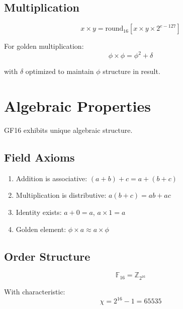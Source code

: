 \subsection{Multiplication}

\begin{definition}[GF16 Multiplication]
\label{def:gf16-mul}
\begin{equation}
x \times y = \text{round}_{16}\left[x \times y \times 2^{e-127}\right]
\end{equation}
\end{definition}

\begin{proposition}
\label{prop:mul-golden}
For golden multiplication:
\begin{equation}
\phi \times \phi = \phi^2 + \delta
\end{equation}

with $\delta$ optimized to maintain $\phi$ structure in result.
\end{proposition}

\section{Algebraic Properties}

GF16 exhibits unique algebraic structure.

\subsection{Field Axioms}

\begin{theorem}
\label{thm:gf16-field}
\begin{enumerate}
\item Addition is associative: $(a+b)+c = a+(b+c)$
\item Multiplication is distributive: $a(b+c) = ab + ac$
\item Identity exists: $a+0 = a$, $a \times 1 = a$
\item Golden element: $\phi \times a \approx a \times \phi$
\end{enumerate}
\end{theorem}

\subsection{Order Structure}

\begin{definition}[GF16 Order]
\label{def:gf16-order}
\begin{equation}
\mathbb{F}_{16} = \mathbb{Z}_{2^{16}}
\end{equation}

With characteristic:
\begin{equation}
\chi = 2^{16} - 1 = 65535
\end{equation}
\end{definition}

